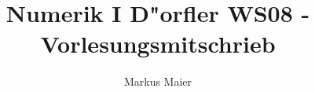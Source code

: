 \documentclass{scrartcl}
\begin{document}
\newenvironment{aaufz}
               {\renewcommand{\labelenumi}{\alph{enumi})}
                \renewcommand{\labelenumii}{\alph{enumii})}
                \begin{enumerate}}
               {\end{enumerate}}

\newenvironment{iaufz}
               {\renewcommand{\labelenumi}{(\roman{enumi})}
                \renewcommand{\labelenumii}{(\roman{enumii})}
                \begin{enumerate}}
               {\end{enumerate}}
\newenvironment{1aufz}
               {\renewcommand{\labelenumi}{\arabic{enumi}.)}
                \renewcommand{\labelenumii}{\arabic{enumii}.)}
                \begin{enumerate}}
               {\end{enumerate}}

\newcommand{\RR}{\mathbb{R}}
\newcommand{\CC}{\mathbb{C}}
\newcommand{\NN}{\mathbb{N}}
\newcommand{\FF}{\mathbb{F}}
\newcommand{\PP}{\mathbb{P}}
\newcommand{\ZZ}{\mathbb{Z}}
\newcommand{\LL}{\mathbb{L}}
\newcommand{\rd}{\mathrm{rd}}
\newcommand{\Vvert}{\vert \hspace{-0.7pt} \vert \hspace{-0.7pt} \vert}
\newcommand{\supp}{\mathrm{supp} \,}
\newcommand{\gradient}{\mathrm{grad} \, }
\newcommand{\divergenz}{\mathrm{div} \, }
\newcommand{\tridiag}{\mathrm{tridiag}}
\newcommand{\diag}{\mathrm{diag}}
\newcommand{\cond}{\mathrm{cond}}
\newcommand{\Bild}{\mathrm{Bild}}
\newcommand{\Rang}{\mathrm{Rang}}
\newcommand{\spann}{\mathrm{span}}
\newcommand{\spec}{\mathrm{spec}}
\newcommand{\compl}{\mathrm{compl}}
\newcommand{\Tol}{\mathrm{Tol}}
\renewcommand{\d}{\, \mathrm{d}}
\renewcommand{\O}{\mathcal{O}}
\newcommand{\subsubsub}[1]{\paragraph*{#1} \ }

\newtheorem{Lemma}{Lemma}
\newtheorem{Thm}{Theorem}
\newtheorem{Satz}{Satz}
\newtheorem*{Beweis}{Beweis}
\newtheorem*{Def}{Definition}


\newenvironment{Bew}{\begin{Beweis}}{\qed \end{Beweis}}

\title{Numerik I D"orfler WS08 - Vorlesungsmitschrieb}
\author{Markus Maier}
\date{}
\maketitle
\end{document}
